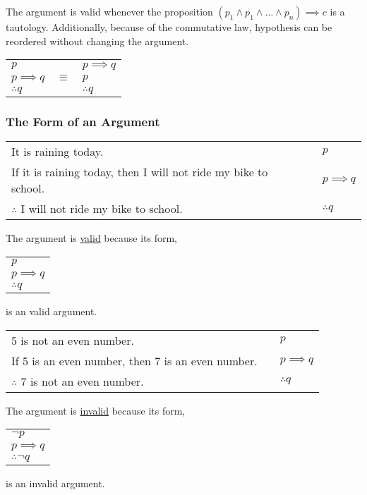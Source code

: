 The argument is valid whenever the proposition $(p_1 \land p_1 \land \dots \land p_n) \implies c$ is a tautology.
Additionally, because of the commutative law, hypothesis can be reordered without changing the argument.
\begin{center}
  \begin{tabular}{lcl}
    $p$            & \multirow{3}{*}{$\equiv$} & $p \implies q$ \\
    $p \implies q$ &                           & $p$            \\
    \hhline{-~-}
    $\therefore q$ &                           & $\therefore q$
  \end{tabular}
\end{center}

\subsubsection{The Form of an Argument}

\begin{center}
  \begin{tabular}{lcl}
    It is raining today.                                            &  & $p$            \\
    If it is raining today, then I will not ride my bike to school. &  & $p \implies q$ \\
    \hhline{-~-}
    $\therefore$ I will not ride my bike to school.                 &  & $\therefore q$
  \end{tabular}

  The argument is \underline{valid} because its form,
  \begin{tabular}{l}
    $p$            \\
    $p \implies q$ \\
    \hline
    $\therefore q$
  \end{tabular}
  is an valid argument.

\end{center}

\begin{center}
  \begin{tabular}{lcl}
    5 is not an even number.                          &  & $p$            \\
    If 5 is an even number, then 7 is an even number. &  & $p \implies q$ \\
    \hhline{-~-}
    $\therefore$ 7 is not an even number.             &  & $\therefore q$
  \end{tabular}

  The argument is \underline{invalid} because its form,
  \begin{tabular}{l}
    $\lnot p$      \\
    $p \implies q$ \\
    \hline
    $\therefore \lnot q$
  \end{tabular}
  is an invalid argument.
\end{center}

